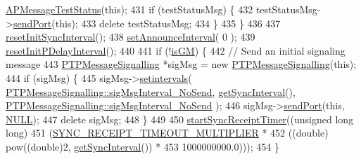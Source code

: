 \begin{DoxyCode}
      \hyperlink{class_a_p_message_test_status}{APMessageTestStatus}(\textcolor{keyword}{this});
431                 \textcolor{keywordflow}{if} (testStatusMsg) \{
432                     testStatusMsg->\hyperlink{class_a_p_message_test_status_ac5f42348a1173af6a28f40d24eae897a}{sendPort}(\textcolor{keyword}{this});
433                     \textcolor{keyword}{delete} testStatusMsg;
434                 \}
435             \}
436 
437             \hyperlink{class_common_port_a7e4b6dfc0822ebebb0874ed2bdd91b10}{resetInitSyncInterval}();
438             \hyperlink{class_common_port_a55a6b4ff487cd157501f921a27db0d9c}{setAnnounceInterval}( 0 );
439             \hyperlink{class_common_port_a581ecd601f511bc0e7378f12ff690c63}{resetInitPDelayInterval}();
440 
441             \textcolor{keywordflow}{if} (!\hyperlink{class_ether_port_ac1d89714b4aa7aa5414b44238e26d5a2}{isGM}) \{
442                 \textcolor{comment}{// Send an initial signaling message}
443                 \hyperlink{class_p_t_p_message_signalling}{PTPMessageSignalling} *sigMsg = \textcolor{keyword}{new} 
      \hyperlink{class_p_t_p_message_signalling}{PTPMessageSignalling}(\textcolor{keyword}{this});
444                 \textcolor{keywordflow}{if} (sigMsg) \{
445                     sigMsg->\hyperlink{class_p_t_p_message_signalling_a1b9bbfe9bf03aad89a23e56d065e714c}{setintervals}(
      \hyperlink{class_p_t_p_message_signalling_afcb2a19f3190abbb589f24267c8cd636}{PTPMessageSignalling::sigMsgInterval\_NoSend}, 
      \hyperlink{class_common_port_a963da67f8dd0b8c72bd19ca91c3ce00d}{getSyncInterval}(), \hyperlink{class_p_t_p_message_signalling_afcb2a19f3190abbb589f24267c8cd636}{PTPMessageSignalling::sigMsgInterval\_NoSend}
      );
446                     sigMsg->\hyperlink{class_p_t_p_message_signalling_a0c6f07200fa46634360d356ebb10dfe0}{sendPort}(\textcolor{keyword}{this}, \hyperlink{openavb__types__base__pub_8h_a070d2ce7b6bb7e5c05602aa8c308d0c4}{NULL});
447                     \textcolor{keyword}{delete} sigMsg;
448                 \}
449 
450                 \hyperlink{class_common_port_a25bf37b5026e4b86b138498915330656}{startSyncReceiptTimer}((\textcolor{keywordtype}{unsigned} \textcolor{keywordtype}{long} \textcolor{keywordtype}{long})
451                      (\hyperlink{common__port_8hpp_ab8e9bce6c4f31a2db1b778fdfd63fae3}{SYNC\_RECEIPT\_TIMEOUT\_MULTIPLIER} *
452                       ((\textcolor{keywordtype}{double}) pow((\textcolor{keywordtype}{double})2, \hyperlink{class_common_port_a963da67f8dd0b8c72bd19ca91c3ce00d}{getSyncInterval}()) *
453                        1000000000.0)));
454             \}

\end{DoxyCode}
